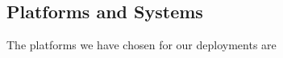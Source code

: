 \documentclass{article}[10pt]
\numberwithin{equation}{section}
\begin{document}
\begin{multicols}{2}
\begin{flushleft}
\subsection{Platforms and Systems}
\begin{spacing}{1.4}
The platforms we have chosen for our deployments are 
\end{spacing}
























\end{flushleft}
\end{multicols}












































\end{document}
